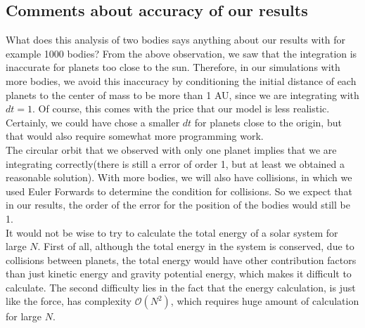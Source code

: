 \subsection{Comments about accuracy of our results}
What does this analysis of two bodies says anything about our results with for example 1000 bodies? From the above observation, we saw that the integration is inaccurate for planets too close to the sun. Therefore, in our simulations with more bodies, we avoid this inaccuracy by conditioning the initial distance of each planets to the center of mass to be more than 1 AU, since we are integrating with $dt=1$. Of course, this comes with the price that our model is less realistic. Certainly, we could have chose a smaller $dt$ for planets close to the origin, but that would also require somewhat more programming work.\\

The circular orbit that we observed with only one planet implies that we are integrating correctly(there is still a error of order 1, but at least we obtained a reasonable solution). With more bodies, we will also have collisions, in which we used Euler Forwards to determine the condition for collisions. So we expect that in our results, the order of the error for the position of the bodies would still be 1.\\

It would not be wise to try to calculate the total energy of a solar system for large $N$. First of all, although the total energy in the system is conserved, due to collisions between planets, the total energy would have other contribution factors than just kinetic energy and gravity potential energy, which makes it difficult to calculate. The second difficulty lies in the fact that the energy calculation, is just like the force, has complexity $\mathcal{O}(N^2)$, which requires huge amount of calculation for large $N$.